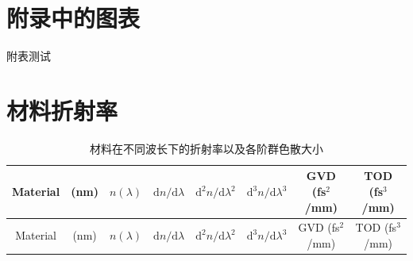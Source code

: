 \chapter{附录中的图表}\label{chap:app2}{
\setcounter{app_fig}{1}
\setcounter{app_tab}{1}


附表测试
}



\chapter{材料折射率}\label{chap:app3}{
\setcounter{app_fig}{1}
\setcounter{app_tab}{1}


\small
\setlength{\tabcolsep}{4pt}
\renewcommand{\arraystretch}{1.1}

\begin{longtable}{cccccccc}
\caption{材料在不同波长下的折射率以及各阶群色散大小}
\label{dispersion}
\toprule
Material & (nm) & $n(\lambda)$ & $\mathrm{d}n/\mathrm{d}\lambda$ & $\mathrm{d}^2n/\mathrm{d}\lambda^2$ & $\mathrm{d}^3n/\mathrm{d}\lambda^3$ & GVD (fs$^2$/mm) & TOD (fs$^3$/mm) \\
\midrule
\endfirsthead

\toprule
Material & (nm) & $n(\lambda)$ & $\mathrm{d}n/\mathrm{d}\lambda$ & $\mathrm{d}^2n/\mathrm{d}\lambda^2$ & $\mathrm{d}^3n/\mathrm{d}\lambda^3$ & GVD (fs$^2$/mm) & TOD (fs$^3$/mm) \\
\midrule
\endhead


\end{longtable}}
